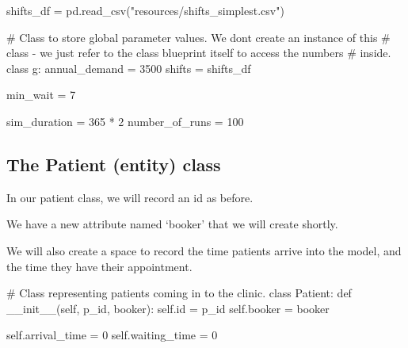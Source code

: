 \documentclass[
  letterpaper,
  DIV=11,
  numbers=noendperiod]{scrreprt}
\newenvironment{Shaded}{}{}
\newcommand{\BuiltInTok}[1]{\textcolor[rgb]{0.84,0.23,0.29}{#1}}
\newcommand{\CommentTok}[1]{\textcolor[rgb]{0.42,0.45,0.49}{#1}}
\newcommand{\DecValTok}[1]{\textcolor[rgb]{0.00,0.36,0.77}{#1}}
\newcommand{\FunctionTok}[1]{\textcolor[rgb]{0.44,0.26,0.76}{#1}}
\newcommand{\KeywordTok}[1]{\textcolor[rgb]{0.84,0.23,0.29}{#1}}
\newcommand{\NormalTok}[1]{\textcolor[rgb]{0.14,0.16,0.18}{#1}}
\newcommand{\OperatorTok}[1]{\textcolor[rgb]{0.14,0.16,0.18}{#1}}
\newcommand{\StringTok}[1]{\textcolor[rgb]{0.01,0.18,0.38}{#1}}
\newcommand{\VariableTok}[1]{\textcolor[rgb]{0.89,0.38,0.04}{#1}}
\begin{document}
\begin{Shaded}
\begin{Highlighting}[]
\NormalTok{shifts\_df }\OperatorTok{=}\NormalTok{ pd.read\_csv(}\StringTok{"resources/shifts\_simplest.csv"}\NormalTok{)}

\CommentTok{\# Class to store global parameter values.  We don\textquotesingle{}t create an instance of this}
\CommentTok{\# class {-} we just refer to the class blueprint itself to access the numbers}
\CommentTok{\# inside.}
\KeywordTok{class}\NormalTok{ g:}
\NormalTok{    annual\_demand }\OperatorTok{=} \DecValTok{3500}
\NormalTok{    shifts }\OperatorTok{=}\NormalTok{ shifts\_df}

\NormalTok{    min\_wait }\OperatorTok{=} \DecValTok{7}

\NormalTok{    sim\_duration }\OperatorTok{=} \DecValTok{365} \OperatorTok{*} \DecValTok{2}
\NormalTok{    number\_of\_runs }\OperatorTok{=} \DecValTok{100}
\end{Highlighting}
\end{Shaded}

\subsection{The Patient (entity) class}\label{the-patient-entity-class}

In our patient class, we will record an id as before.

We have a new attribute named `booker' that we will create shortly.

We will also create a space to record the time patients arrive into the
model, and the time they have their appointment.

\begin{Shaded}
\begin{Highlighting}[]
\CommentTok{\# Class representing patients coming in to the clinic.}
\KeywordTok{class}\NormalTok{ Patient:}
    \KeywordTok{def} \FunctionTok{\_\_init\_\_}\NormalTok{(}\VariableTok{self}\NormalTok{, p\_id, booker):}
        \VariableTok{self}\NormalTok{.}\BuiltInTok{id} \OperatorTok{=}\NormalTok{ p\_id}
        \VariableTok{self}\NormalTok{.booker }\OperatorTok{=}\NormalTok{ booker}

        \VariableTok{self}\NormalTok{.arrival\_time }\OperatorTok{=} \DecValTok{0}
        \VariableTok{self}\NormalTok{.waiting\_time }\OperatorTok{=} \DecValTok{0}
\end{Highlighting}
\end{Shaded}
\end{document}
